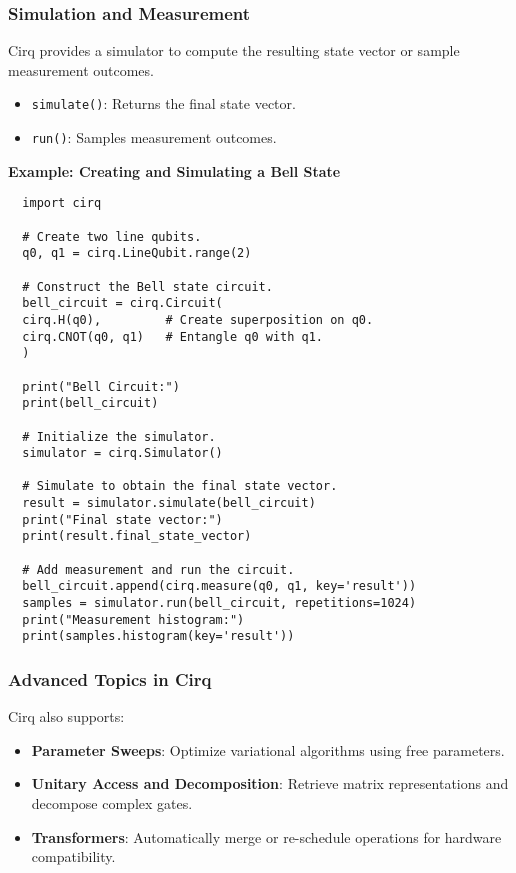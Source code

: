 \subsubsection*{Simulation and Measurement}

Cirq provides a simulator to compute the resulting state vector or sample
measurement outcomes.

\begin{itemize}
  \item \texttt{simulate()}: Returns the final state vector.
  \item \texttt{run()}: Samples measurement outcomes.
\end{itemize}

\textbf{Example: Creating and Simulating a Bell State}
\begin{verbatim}
  import cirq

  # Create two line qubits.
  q0, q1 = cirq.LineQubit.range(2)

  # Construct the Bell state circuit.
  bell_circuit = cirq.Circuit(
  cirq.H(q0),         # Create superposition on q0.
  cirq.CNOT(q0, q1)   # Entangle q0 with q1.
  )

  print("Bell Circuit:")
  print(bell_circuit)

  # Initialize the simulator.
  simulator = cirq.Simulator()

  # Simulate to obtain the final state vector.
  result = simulator.simulate(bell_circuit)
  print("Final state vector:")
  print(result.final_state_vector)

  # Add measurement and run the circuit.
  bell_circuit.append(cirq.measure(q0, q1, key='result'))
  samples = simulator.run(bell_circuit, repetitions=1024)
  print("Measurement histogram:")
  print(samples.histogram(key='result'))
\end{verbatim}

\subsubsection*{Advanced Topics in Cirq}

Cirq also supports:

\begin{itemize}

  \item \textbf{Parameter Sweeps}: Optimize variational algorithms using free
    parameters.

  \item \textbf{Unitary Access and Decomposition}: Retrieve matrix
    representations and decompose complex gates.

  \item \textbf{Transformers}: Automatically merge or re-schedule operations
    for hardware compatibility.

\end{itemize}

